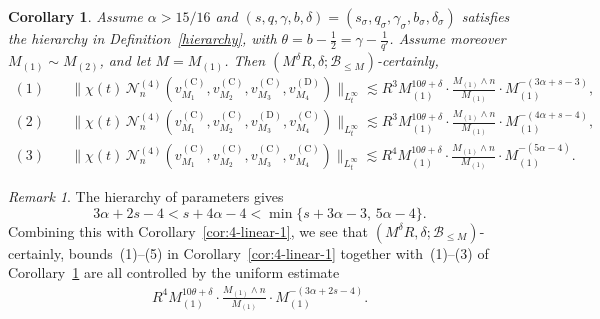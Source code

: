 \documentclass[11pt,reqno,english]{amsart}
\numberwithin{equation}{section}
\theoremstyle{plain}
\newtheorem{corollary}[theorem]{Corollary}
\theoremstyle{definition}
\theoremstyle{remark}
\newtheorem{remark}[theorem]{Remark}
\begin{document}
\begin{corollary}\label{cor:4-linearprob}
	Assume $\alpha>15/16$ and $(s,q,\gamma,b,\delta)=(s_{\sigma},q_{\sigma},\gamma_{\sigma},b_{\sigma},\delta_{\sigma})$ satisfies the hierarchy in Definition~\ref{hierarchy}, with $\theta=b-\frac{1}{2}=\gamma-\frac{1}{q'}$. Assume moreover $M_{(1)}\sim M_{(2)}$, and let $M=M_{(1)}$.
Then $(M^{\delta}R,\delta;\mathcal{B}_{\leq M})$-certainly,
	\begin{align*}
		\mathrm{(1)} \quad &
		\|\chi(t)\,\mathcal{N}_n^{(4)}(v^{(\mathrm{C})}_{M_1},v^{(\mathrm{C})}_{M_2},v^{(\mathrm{C})}_{M_3},v^{(\mathrm{D})}_{M_4})\|_{L_t^{\infty}}
		\lesssim
		R^3 M_{(1)}^{10\theta+\delta}\cdot
		\frac{M_{(1)}\wedge n}{M_{(1)}}\cdot M_{(1)}^{-(3\alpha+s-3)},\\
		\mathrm{(2)} \quad &
		\|\chi(t)\,\mathcal{N}_n^{(4)}(v^{(\mathrm{C})}_{M_1},v^{(\mathrm{C})}_{M_2},v^{(\mathrm{D})}_{M_3},v^{(\mathrm{C})}_{M_4})\|_{L_t^{\infty}}
		\lesssim
		R^3 M_{(1)}^{10\theta+\delta}\cdot
		\frac{M_{(1)}\wedge n}{M_{(1)}}\cdot
		M_{(1)}^{-(4\alpha+s-4)},\\
		\mathrm{(3)}\quad &
		\|\chi(t)\,\mathcal{N}_n^{(4)}(v^{(\mathrm{C})}_{M_1},v^{(\mathrm{C})}_{M_2},v^{(\mathrm{C})}_{M_3},v^{(\mathrm{C})}_{M_4})\|_{L_t^{\infty}}
		\lesssim
		R^4
		M_{(1)}^{10\theta+\delta}\cdot
		\frac{M_{(1)}\wedge n}{M_{(1)}}\cdot
		M_{(1)}^{-(5\alpha-4)}.
	\end{align*}
\end{corollary}

\begin{remark}\label{rmk:numerologyquintic}
	The hierarchy of parameters gives
	\[
	3\alpha+2s-4<s+4\alpha-4< \min\{s+3\alpha-3,\, 5\alpha-4\}.
	\]
	Combining this with Corollary~\ref{cor:4-linear-1}, we see that $(M^{\delta}R,\delta;\mathcal{B}_{\leq M})$-certainly, bounds~(1)--(5) in Corollary~\ref{cor:4-linear-1} together with~(1)--(3) of Corollary~\ref{cor:4-linearprob} are all controlled by the uniform estimate
	\begin{align}\label{finalbd:Nn4}
		R^4 M_{(1)}^{10\theta+\delta}\cdot\frac{M_{(1)}\wedge n}{M_{(1)}}\cdot M_{(1)}^{-(3\alpha+2s-4)}.
	\end{align}
\end{remark}
\end{document}

